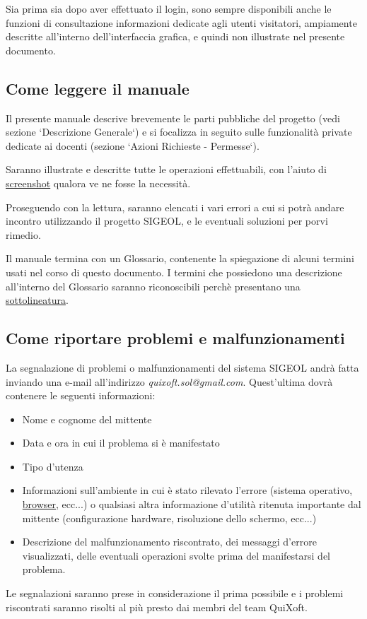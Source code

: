 \documentclass[11pt,a4paper]{article}
\begin{document}
Sia prima sia dopo aver effettuato il login, sono sempre disponibili anche le funzioni di consultazione informazioni dedicate agli utenti visitatori, ampiamente descritte all'interno dell'interfaccia grafica, e quindi non illustrate nel presente documento.
\subsection{Come leggere il manuale}
Il presente manuale descrive brevemente le parti pubbliche del progetto (vedi sezione `Descrizione Generale`) e si focalizza in seguito sulle funzionalità private dedicate ai docenti (sezione `Azioni Richieste - Permesse`).

Saranno illustrate e descritte tutte le operazioni effettuabili, con l'aiuto di \underline{screenshot} qualora ve ne fosse la necessità.

Proseguendo con la lettura, saranno elencati i vari errori a cui si potrà andare incontro utilizzando il progetto SIGEOL, e le eventuali soluzioni per porvi rimedio.

Il manuale termina con un Glossario, contenente la spiegazione di alcuni termini usati nel corso di questo documento.
I termini che possiedono una descrizione all'interno del Glossario saranno riconoscibili perchè presentano una \underline{sottolineatura}.

\subsection{Come riportare problemi e malfunzionamenti}
La segnalazione di problemi o malfunzionamenti del sistema SIGEOL andrà fatta inviando una e-mail all'indirizzo \textit{quixoft.sol@gmail.com}.
Quest'ultima dovrà contenere le seguenti informazioni:
\begin{itemize}
 \item Nome e cognome del mittente
 \item Data e ora in cui il problema si è manifestato
 \item Tipo d'utenza
 \item Informazioni sull'ambiente in cui è stato rilevato l'errore (sistema operativo, \underline{browser}, ecc...) o qualsiasi altra informazione d'utilità ritenuta importante dal mittente (configurazione hardware, risoluzione dello schermo, ecc...)
 \item Descrizione del malfunzionamento riscontrato, dei messaggi d'errore visualizzati, delle eventuali operazioni svolte prima del manifestarsi del problema.
\end{itemize}
Le segnalazioni saranno prese in considerazione il prima possibile e i problemi riscontrati saranno risolti al più presto dai membri del team QuiXoft.
\end{document}
